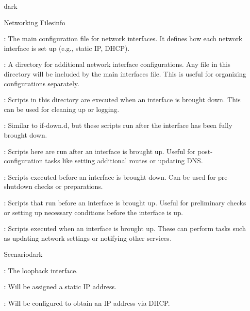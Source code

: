 \label{Networking}
\begin{baseBoxThree}{}{dark}

    \label{Networking Files}
    \begin{baseBoxThree}{Networking Files}{info}
        \smallskip
        \begin{posnexItemize}
            \item[\sA] : The main configuration file for network interfaces. It defines how each network interface is set up (e.g., static IP, DHCP).
            \item[\sA] : A directory for additional network interface configurations. Any file in this directory will be included by the main interfaces file. This is useful for organizing configurations separately. 
            \item[\sA] : Scripts in this directory are executed when an interface is brought down. This can be used for cleaning up or logging. 
            \item[\sA] : Similar to if-down.d, but these scripts run after the interface has been fully brought down. 
            \item[\sA] : Scripts here are run after an interface is brought up. Useful for post-configuration tasks like setting additional routes or updating DNS.
            \item[\sA] : Scripts executed before an interface is brought down. Can be used for pre-shutdown checks or preparations.
            \item[\sA] : Scripts that run before an interface is brought up. Useful for preliminary checks or setting up necessary conditions before the interface is up.
            \item[\sA] : Scripts executed when an interface is brought up. These can perform tasks such as updating network settings or notifying other services.
        \end{posnexItemize}
        \smallskip
    \end{baseBoxThree}
    \smallskip
    \label{Scripts in Action}
    \begin{baseBoxThree}{Scenario}{dark}
        \smallskip
        \begin{posnexItemize}
            \item[\sA] : The loopback interface.
            \item[\sA] : Will be assigned a static IP address.
            \item[\sA] : Will be configured to obtain an IP address via DHCP.
        \end{posnexItemize}        
        \smallskip
    \end{baseBoxThree}
\end{baseBoxThree}

